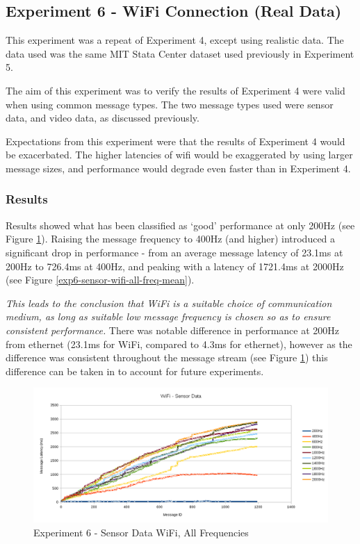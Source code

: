 \documentclass[../dissertation.tex]{subfiles}
\begin{document}
\subsection{Experiment 6 - WiFi Connection (Real Data)}
\label{experiment-6}

This experiment was a repeat of Experiment 4, except using realistic data. The data used was the same MIT Stata Center dataset used previously in Experiment 5.

The aim of this experiment was to verify the results of Experiment 4 were valid when using common message types. The two message types used were sensor data, and video data, as discussed previously.

Expectations from this experiment were that the results of Experiment 4 would be exacerbated. The higher latencies of wifi would be exaggerated by using larger message sizes, and performance would degrade even faster than in Experiment 4.

\subsubsection{Results}

Results showed what has been classified as `good' performance at only 200Hz (see Figure \ref{exp6-sensor-wifi-all-freq-stream}). Raising the message frequency to 400Hz (and higher) introduced a significant drop in performance - from an average message latency of 23.1ms at 200Hz to 726.4ms at 400Hz, and peaking with a latency of 1721.4ms at 2000Hz (see Figure \ref{exp6-sensor-wifi-all-freq-mean}).

\textit{This leads to the conclusion that WiFi is a suitable choice of communication medium, as long as suitable low message frequency is chosen so as to ensure consistent performance.} There was notable difference in performance at 200Hz from ethernet (23.1ms for WiFi, compared to 4.3ms for ethernet), however as the difference was consistent throughout the message stream (see Figure \ref{exp6-sensor-wifi-all-freq-stream}) this difference can be taken in to account for future experiments.

\begin{figure}[H]
\centering
\includegraphics[width=\textwidth]{images/experiment6/sensor_data_wifi_all_freqs_stream.png}
\caption{Experiment 6 - Sensor Data WiFi, All Frequencies}
\label{exp6-sensor-wifi-all-freq-stream}
\end{figure}
\end{document}
